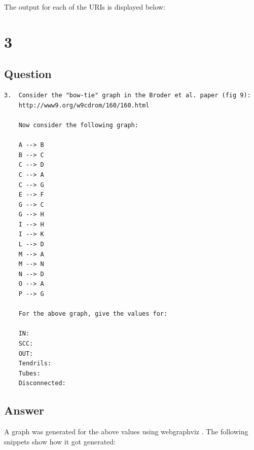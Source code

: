 \documentclass[letterpaper,12pt]{article}
\begin{document}
The output for each of the URIs is displayed below:








\clearpage


\section*{3}

\subsection*{Question}

\begin{verbatim}
3.  Consider the "bow-tie" graph in the Broder et al. paper (fig 9):
    http://www9.org/w9cdrom/160/160.html

    Now consider the following graph:

    A --> B
    B --> C
    C --> D
    C --> A
    C --> G
    E --> F
    G --> C
    G --> H
    I --> H
    I --> K
    L --> D
    M --> A
    M --> N
    N --> D
    O --> A
    P --> G 
    
    For the above graph, give the values for:

    IN: 
    SCC: 
    OUT: 
    Tendrils: 
    Tubes: 
    Disconnected:
\end{verbatim}

\clearpage
\subsection*{Answer}

A graph was generated for the above values using webgraphviz \cite{webgraphvizref}. The following snippets show how it got generated:
\end{document}
